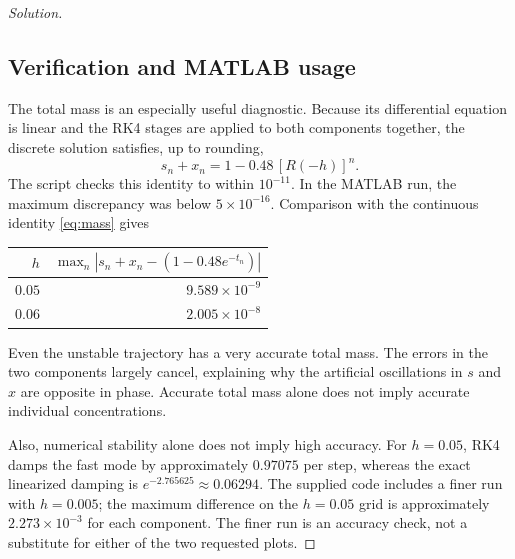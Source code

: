 \documentclass[12pt]{amsart}
\newenvironment{solution}
{\begin{proof}[Solution]}
{\end{proof}}
\begin{document}
\begin{onehalfspace}
\begin{solution}
            \subsection*{Verification and MATLAB usage}
            The total mass is an especially useful diagnostic. Because its differential
            equation is linear and the RK4 stages are applied to both components
            together, the discrete solution satisfies, up to rounding,
            \[
                s_n+x_n=1-0.48\,[R(-h)]^n.
            \]
            The script checks this identity to within $10^{-11}$. In the MATLAB run,
            the maximum discrepancy was below $5\times10^{-16}$. Comparison with
            the continuous identity \eqref{eq:mass} gives
            \begin{center}
                \begin{tabular}{rr}\toprule
                    $h$ & $\displaystyle\max_n|s_n+x_n-(1-0.48e^{-t_n})|$\\\midrule
                    $0.05$ & $9.589\times10^{-9}$\\
                    $0.06$ & $2.005\times10^{-8}$\\\bottomrule
                \end{tabular}
            \end{center}
            Even the unstable trajectory has a very accurate total mass. The errors
            in the two components largely cancel, explaining why the artificial
            oscillations in $s$ and $x$ are opposite in phase. Accurate total mass
            alone does not imply accurate individual concentrations.

            Also, numerical stability alone does not imply high accuracy. For
            $h=0.05$, RK4 damps the fast mode by approximately $0.97075$ per step,
            whereas the exact linearized damping is $e^{-2.765625}\approx0.06294$.
            The supplied code includes a finer run with $h=0.005$; the maximum
            difference on the $h=0.05$ grid is approximately $2.273\times10^{-3}$
            for each component. The finer run is an accuracy check, not a substitute
            for either of the two requested plots.
        \end{solution}


\end{onehalfspace}
\end{document}
